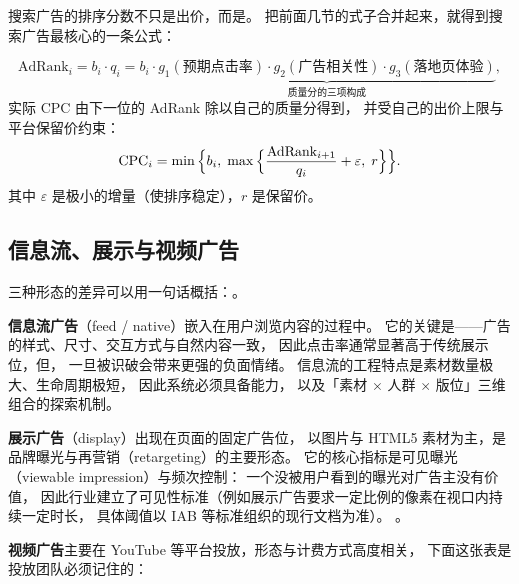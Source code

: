 搜索广告的排序分数不只是出价，而是。
把前面几节的式子合并起来，就得到搜索广告最核心的一条公式：

\begin{formulacard}[搜索广告排序分数]
\begin{equation}
\text{AdRank}_i = b_i \cdot q_i
= b_i \cdot \underbrace{g_1(\text{预期点击率}) \cdot g_2(\text{广告相关性}) \cdot g_3(\text{落地页体验})}_{\text{质量分的三项构成}} ,
\label{eq:adrank}
\end{equation}
实际 CPC 由下一位的 AdRank 除以自己的质量分得到，
并受自己的出价上限与平台保留价约束：
\begin{equation}
\operatorname{CPC}_i = \min\Big\{ b_i,\; \max\Big\{ \frac{\text{AdRank}_{i+1}}{q_i} + \varepsilon,\; r \Big\} \Big\} .
\label{eq:adrank-cpc}
\end{equation}
其中 $\varepsilon$ 是极小的增量（使排序稳定），$r$ 是保留价。
\end{formulacard}

\subsection{信息流、展示与视频广告}

三种形态的差异可以用一句话概括：。

\textbf{信息流广告}（feed / native）嵌入在用户浏览内容的过程中。
它的关键是——广告的样式、尺寸、交互方式与自然内容一致，
因此点击率通常显著高于传统展示位，但，
一旦被识破会带来更强的负面情绪。
信息流的工程特点是素材数量极大、生命周期极短，
因此系统必须具备能力，
以及「素材 $\times$ 人群 $\times$ 版位」三维组合的探索机制。

\textbf{展示广告}（display）出现在页面的固定广告位，
以图片与 HTML5 素材为主，是品牌曝光与再营销（retargeting）的主要形态。
它的核心指标是可见曝光（viewable impression）与频次控制：
一个没被用户看到的曝光对广告主没有价值，
因此行业建立了可见性标准（例如展示广告要求一定比例的像素在视口内持续一定时长，
具体阈值以 IAB 等标准组织的现行文档为准）。
。

\textbf{视频广告}主要在 YouTube 等平台投放，形态与计费方式高度相关，
下面这张表是投放团队必须记住的：

